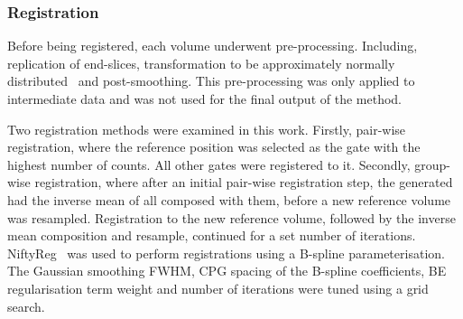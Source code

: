             \subsubsection{Registration} \label{sec:comparison_of_motion_correction_methods_incorporating_motion_modelling_for_pet/ct_using_a_single_breath_hold_attenuation_map_registration}
                Before being registered, each volume underwent pre-processing. Including, replication of end-slices, transformation to be approximately normally distributed~\parencite{Johnson2013} and post-smoothing. This pre-processing was only applied to intermediate data and was not used for the final output of the method.%
                
                Two registration methods were examined in this work. Firstly, pair-wise registration, where the reference position was selected as the gate with the highest number of counts. All other gates were registered to it. Secondly, group-wise registration, where after an initial pair-wise registration step, the  generated had the inverse mean of all  composed with them, before a new reference volume was resampled. Registration to the new reference volume, followed by the inverse mean composition and resample, continued for a set number of iterations. NiftyReg~\parencite{Modat2010} was used to perform registrations using a B-spline parameterisation. The Gaussian smoothing \gls{FWHM}, \gls{CPG} spacing of the B-spline coefficients, \gls{BE} regularisation term weight and number of iterations were tuned using a grid search.
            
